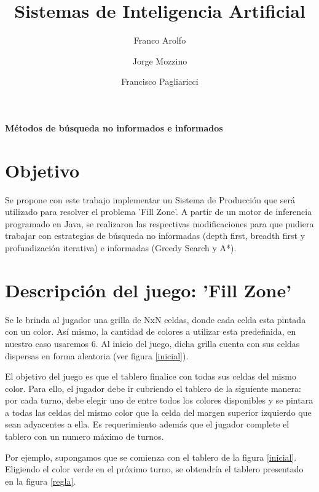 \documentclass{article}
\title{Sistemas de Inteligencia Artificial}
\author{Franco Arolfo \and Jorge Mozzino \and Francisco Pagliaricci}
\begin{document}
\begin{titlepage}

\maketitle
\thispagestyle{empty}
\vspace{5cm}
\centerline{\textbf{\LARGE{M\'etodos de b\'usqueda no informados e informados}}}
\vspace{1.24cm}
\vspace{3.75cm}
\end{titlepage}


\newpage

\section{Objetivo}
Se propone con este trabajo implementar un Sistema de Producci\'on que ser\'a utilizado para resolver el problema 'Fill Zone'.
A partir de un motor de inferencia programado en Java, se realizaron las respectivas modificaciones para que pudiera trabajar con estrategias de b\'usqueda no informadas (depth first, breadth first y profundizaci\'on iterativa) e informadas (Greedy Search y A*).

\section{Descripci\'on del juego: 'Fill Zone'}
Se le brinda al jugador una grilla de NxN celdas, donde cada celda esta pintada con un color. As\'i mismo, la cantidad de colores a utilizar esta predefinida, en nuestro caso usaremos 6.
Al inicio del juego, dicha grilla cuenta con sus celdas dispersas en forma aleatoria (ver figura \ref{inicial}).

El objetivo del juego es que el tablero finalice con todas sus celdas del mismo color. Para ello, el jugador debe ir cubriendo el tablero de la siguiente manera: por cada turno, debe elegir uno de entre todos los colores disponibles y se pintara a todas las celdas del mismo color que la celda del margen superior izquierdo que sean adyacentes a ella.
Es requerimiento adem\'as que el jugador complete el tablero con un numero m\'aximo de turnos.

Por ejemplo, supongamos que se comienza con el tablero de la figura \ref{inicial}. Eligiendo el color verde en el pr\'oximo turno, se obtendr\'ia el tablero presentado en la figura \ref{regla}.
\end{document}
